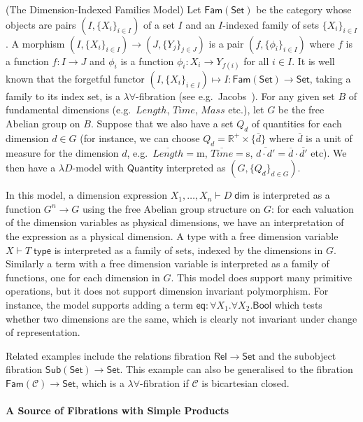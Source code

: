 \documentclass[a4paper,UKenglish]{lipics}
\theoremstyle{plain}
\newcommand{\msf}[1]{\mathsf{#1}} %
\newcommand{\Set}{\msf{Set}}
\newcommand{\Fam}[1]{\msf{Fam}(#1)}
\newcommand{\Sub}[1]{\msf{Sub}(#1)}
\newcommand{\Rel}{\msf{Rel}}
\newcommand{\C}{\mathcal{C}}
\newcommand{\qnt}{\msf{Quantity}}
\newcommand{\bool}{\msf{Bool}}
\newcommand{\lengthDim}{\mathit{Length}}
\newcommand{\timeDim}{\mathit{Time}}
\newcommand{\massDim}{\mathit{Mass}}
\newcommand{\Tj}[2]{#1 \vdash #2 \; \msf{ type}}
\newcommand{\Dj}[2]{#1 \vdash #2 \; \msf{ dim}}
\newcommand{\Dim}{D}
\newcommand{\Dvar}{X}
\begin{document}
\begin{example}(The Dimension-Indexed Families Model)
\label{example:famset}
Let $\Fam\Set$ be the category whose objects are pairs
$(I,\{X_i\}_{i\in I})$ of a set $I$ and an $I$-indexed family of sets
$\{X_i\}_{i\in I}$. A morphism $(I,\{X_i\}_{i\in I}) \to
(J,\{Y_j\}_{j\in J})$ is a pair $(f,\{\phi_i\}_{i\in I})$ where $f$ is
a function $f:I\to J$ and $\phi_i$ is a function $\phi_i:X_i\to
Y_{f(i)}$ for all $i\in I$. It is well known that the forgetful
functor $(I,\{X_i\}_{i\in I}) \mapsto I : \Fam\Set\to \Set$, taking a
family to its index set, is a $\lambda\forall$-fibration (see e.g.\
Jacobs~\cite[Lemma 1.9.5]{jacobs1999categorical}).  For any given set
$B$ of fundamental dimensions (e.g.\ $\lengthDim$, $\timeDim$, $\massDim$ etc.), let $G$ be
the free Abelian group on $B$. Suppose that we also have a set $Q_d$
of quantities for each dimension $d \in G$ (for instance, we can
choose $Q_d = \mathbb R^+ \times \{ \overline{d} \}$ where $\overline{d}$ is
a unit of measure for the dimension $d$, e.g.\
$\overline{\lengthDim} = \mathrm m$, $\overline{\timeDim} = \mathrm s$,
$\overline{d\cdot d'} = \overline{d}\cdot\overline{d'}$ etc). We then
have a $\lambda D$-model with $\qnt$ interpreted as $(G,\{Q_d\}_{d\in
  G})$.

In this model, a dimension expression $\Dj{\Dvar_1,\dots, \Dvar_n}
\Dim$ is interpreted as a function $G^n\to G$ using the free Abelian
group structure on $G$: for each valuation of the dimension variables
as physical dimensions, we have an interpretation of the expression as
a physical dimension. A type with a free dimension variable $\Tj \Dvar
T$ is interpreted as a family of sets, indexed by the dimensions in
$G$. Similarly a term with a free dimension variable is interpreted as
a family of functions, one for each dimension in $G$. This model does
support many primitive operations, but it does not support dimension
invariant polymorphism. For instance, the model supports adding a term
$\mathsf{eq}:\forall \Dvar_1.\forall \Dvar_2.\bool$ which tests
whether two dimensions are the same, which is clearly not invariant
under change of representation.
\end{example}

Related examples include the relations fibration $\Rel \to \Set$ and
the subobject fibration $\Sub{\Set} \to \Set$. This example can also
be generalised to the fibration $\Fam{\C}\to\Set$, which is a
$\lambda\forall$-fibration if $\C$ is bicartesian closed.

\paragraph*{A Source of Fibrations with Simple Products}
\end{document}
